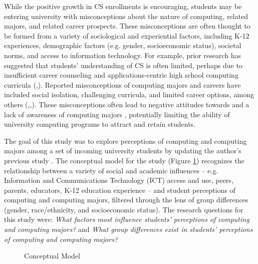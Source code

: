 \documentclass{article}
\begin{document}
While the positive growth in CS enrollments is encouraging, students may be entering university with misconceptions about the nature of computing, related majors, and related career prospects. These misconceptions are often thought to be formed from a variety of sociological and experiential factors, including K-12 experiences, demographic factors (e.g. gender, socioeconomic status), societal norms, and access to information technology. For example, prior research has suggested that students’ understanding of CS is often limited, perhaps due to insufficient career counseling and applications-centric high school computing curricula (\cite{egan2011impact},\cite{galpin2007perceptions}). Reported misconceptions of computing majors and careers have included social isolation, challenging curricula, and limited career options, among others (\cite{clarke1996characterizations},\cite{egan2011impact},\cite{yardi2007computing}). These misconceptions often lead to negative attitudes towards and a lack of awareness of computing majors \cite{grover2014remedying}, potentially limiting the ability of university computing programs to attract and retain students.

The goal of this study was to explore perceptions of computing and computing majors among a set of incoming university students by updating the author’s previous study \cite{stone2010factors}. The conceptual model for the study (Figure \ref{figure:model}) recognizes the relationship between a variety of social and academic influences – e.g. Information and Communications Technology (ICT) access and use, peers, parents, educators, K-12 education experience – and student perceptions of computing and computing majors, filtered through the lens of group differences (gender, race/ethnicity, and socioeconomic status). The research questions for this study were: \textit{What factors most influence students’ perceptions of computing and computing majors?} and \textit{What group differences exist in students’ perceptions of computing and computing majors?}

\begin{figure}[h]
\centering
{}
\caption{Conceptual Model}
\label{figure:model}
\end{figure}
\end{document}
